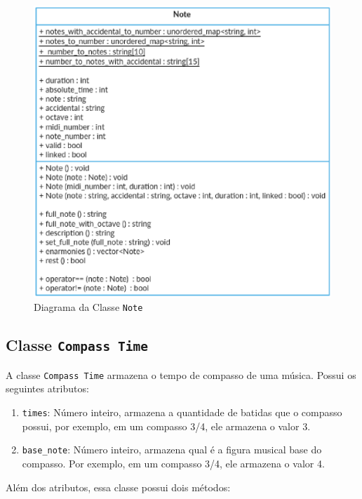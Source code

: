       \begin{figure}[htb]
        \centering
        \includegraphics[scale=0.7]{figuras/noteclass.eps}
        \caption{Diagrama da Classe \texttt{Note}}
        \label{noteclass}
      \end{figure}

    \subsection[Classe \texttt{Compass Time}]{Classe \texttt{Compass Time}}

      A classe \texttt{Compass Time} armazena o tempo de compasso de uma música. Possui os seguintes atributos:

      \begin{enumerate}
        \item \texttt{times}: Número inteiro, armazena a quantidade de batidas que o compasso possui, por exemplo, em um compasso 3/4, ele armazena o valor 3.
        \item \texttt{base\_note}: Número inteiro, armazena qual é a figura musical base do compasso. Por exemplo, em um compasso 3/4, ele armazena o valor 4.
      \end{enumerate}

      Além dos atributos, essa classe possui dois métodos:

